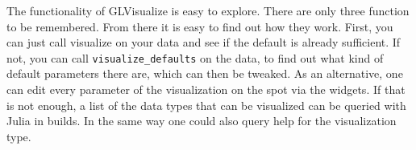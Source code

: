 The functionality of GLVisualize is easy to explore. There are only three function to be remembered. From there it is easy to find out how they work. First, you can just call visualize on your data and see if the default is already sufficient. If not, you can call \texttt{visualize\_defaults} on the data, to find out what kind of default parameters there are, which can then be tweaked. As an alternative, one can edit every parameter of the visualization on the spot via the widgets. 
If that is not enough, a list of the data types that can be visualized can be queried with Julia in builds. 
In the same way one could also query help for the visualization type.


